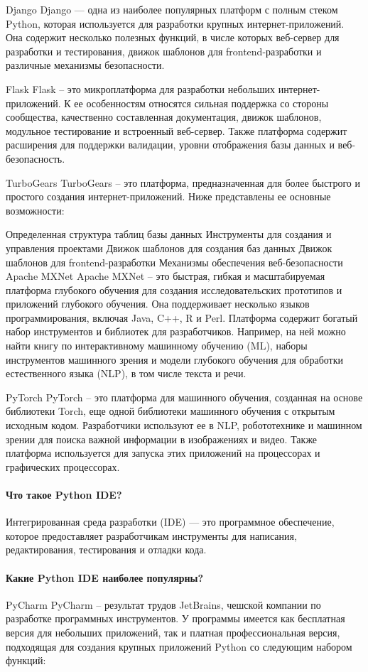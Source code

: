 Django
Django — одна из наиболее популярных платформ с полным стеком Python, которая используется для разработки крупных интернет-приложений. Она содержит несколько полезных функций, в числе которых веб-сервер для разработки и тестирования, движок шаблонов для frontend-разработки и различные механизмы безопасности.

Flask
Flask – это микроплатформа для разработки небольших интернет-приложений. К ее особенностям относятся сильная поддержка со стороны сообщества, качественно составленная документация, движок шаблонов, модульное тестирование и встроенный веб-сервер. Также платформа содержит расширения для поддержки валидации, уровни отображения базы данных и веб-безопасность.

TurboGears
TurboGears – это платформа, предназначенная для более быстрого и простого создания интернет-приложений. Ниже представлены ее основные возможности: 

Определенная структура таблиц базы данных
Инструменты для создания и управления проектами
Движок шаблонов для создания баз данных
Движок шаблонов для frontend-разработки
Механизмы обеспечения веб-безопасности
Apache MXNet
Apache MXNet – это быстрая, гибкая и масштабируемая платформа глубокого обучения для создания исследовательских прототипов и приложений глубокого обучения. Она поддерживает несколько языков программирования, включая Java, C++, R и Perl. Платформа содержит богатый набор инструментов и библиотек для разработчиков. Например, на ней можно найти книгу по интерактивному машинному обучению (ML), наборы инструментов машинного зрения и модели глубокого обучения для обработки естественного языка (NLP), в том числе текста и речи.

PyTorch
PyTorch – это платформа для машинного обучения, созданная на основе библиотеки Torch, еще одной библиотеки машинного обучения с открытым исходным кодом.  Разработчики используют ее в NLP, робототехнике и машинном зрении для поиска важной информации в изображениях и видео. Также платформа используется для запуска этих приложений на процессорах и графических процессорах.

\paragraph{Что такое Python IDE?}
Интегрированная среда разработки (IDE) — это программное обеспечение, которое предоставляет разработчикам инструменты для написания, редактирования, тестирования и отладки кода. 

\paragraph{Какие Python IDE наиболее популярны?}
PyCharm
PyCharm – результат трудов JetBrains, чешской компании по разработке программных инструментов. У программы имеется как бесплатная версия для небольших приложений, так и платная профессиональная версия, подходящая для создания крупных приложений Python со следующим набором функций:


